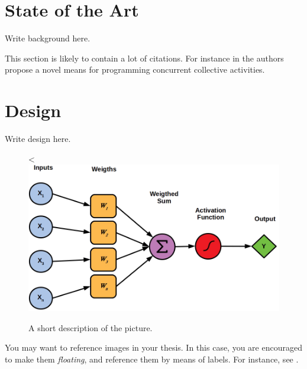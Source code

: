 \documentclass[12pt,a4paper,openright,twoside]{book}
\begin{document}
\chapter{State of the Art} %
\label{chap:background}

Write background here.

This section is likely to contain a lot of citations.
%
For instance in \cite{DBLP:journals/eaai/CasadeiVAPD21} the authors propose a novel means for programming concurrent collective activities.

\chapter{Design} %
\label{chap:design}

Write design here.

\begin{figure}[h] %
	\centering
	<\includegraphics[width=0.8\linewidth]{figures/neuron.png}
	\caption{A short description of the picture.}
	\label{fig:classes}
\end{figure}

You may want to reference images in your thesis.
%
In this case, you are encouraged to make them \emph{floating}, and reference them by means of labels.
%
For instance, see .
%

\end{document}
